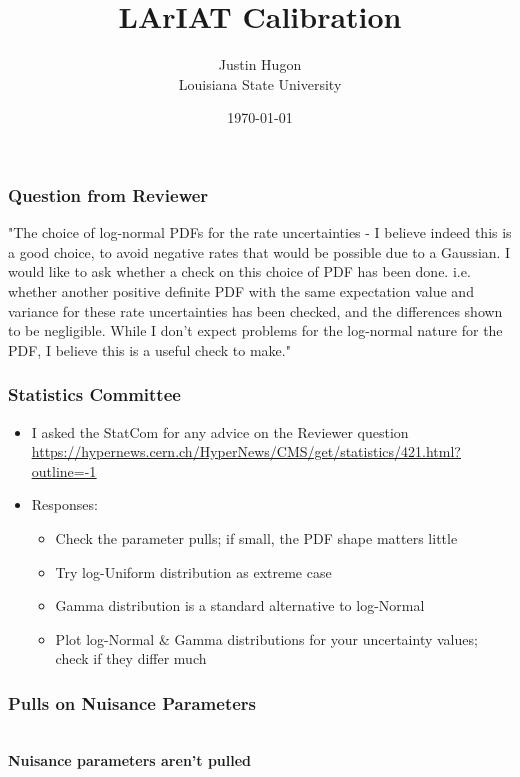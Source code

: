 \documentclass{hugontalk}
\title{LArIAT Calibration}
\date{\today}
\author{Justin Hugon \\ Louisiana State University}
\begin{document}
\hugonfirstpage{}


\begin{frame}
\frametitle{Question from Reviewer}
"The choice of log-normal PDFs for the rate uncertainties - I believe
indeed this is a good choice, to avoid negative rates that would be
possible due to a Gaussian. I would like to ask whether a check on this
choice of PDF has been done. i.e. whether another positive definite PDF
with the same expectation value and variance for these rate
uncertainties has been checked, and the differences shown to be
negligible. While I don't expect problems for the log-normal nature for
the PDF, I believe this is a useful check to make."
\end{frame}

\begin{frame}
\frametitle{Statistics Committee}
\begin{itemize}
  \item I asked the StatCom for any advice on the Reviewer question
        \textcolor{blue}{\tiny\underline{\url{https://hypernews.cern.ch/HyperNews/CMS/get/statistics/421.html?outline=-1}}}
  \item Responses:
  \begin{itemize}
    \item Check the parameter pulls; if small, the PDF shape matters little
    \item Try log-Uniform distribution as extreme case
    \item Gamma distribution is a standard alternative to log-Normal
    \item Plot log-Normal \& Gamma distributions for your uncertainty values; check if they differ much
  \end{itemize}
\end{itemize}
\begin{center}
\end{center}
\end{frame}

\begin{frame}
\frametitle{Pulls on Nuisance Parameters}
\begin{center}
        \\
        \vspace{1ex}
        \bf Nuisance parameters aren't pulled
\end{center}
\end{frame}
\end{document}
